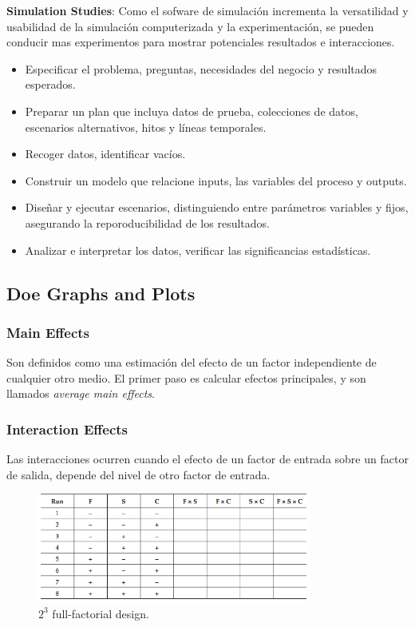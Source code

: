 \documentclass[]{article}
\begin{document}
\textbf{Simulation Studies}: Como el sofware de simulación incrementa la versatilidad y usabilidad de la simulación computerizada y la experimentación, se pueden conducir mas experimentos para mostrar potenciales resultados e interacciones. 

\begin{itemize}
	\item Especificar el problema, preguntas, necesidades del negocio y resultados esperados.
	\item Preparar un plan que incluya datos de prueba, colecciones de datos, escenarios alternativos, hitos y líneas temporales.
	\item Recoger datos, identificar vacíos.
	\item Construir un modelo que relacione inputs, las variables del proceso y outputs.
	\item Diseñar y ejecutar escenarios, distinguiendo entre parámetros variables y fijos, asegurando la reporoducibilidad de los resultados.
	\item Analizar e interpretar los datos, verificar las significancias estadísticas.
\end{itemize}

\subsection{Doe Graphs and Plots}
\subsubsection{Main Effects}
Son definidos como una estimación del efecto de un factor independiente de cualquier otro medio. El primer paso es calcular efectos principales, y son llamados \textit{average main effects}.

\subsubsection{Interaction Effects}
Las interacciones ocurren cuando el efecto de un factor de entrada sobre un factor de salida, depende del nivel de otro factor de entrada.

\begin{figure}[H]
	\centering
	\includegraphics[width=90mm]{imagenes/a23design.png}
	\caption{$2^3$ full-factorial design.}
	\label{fig:A23design}
\end{figure}
\end{document}
